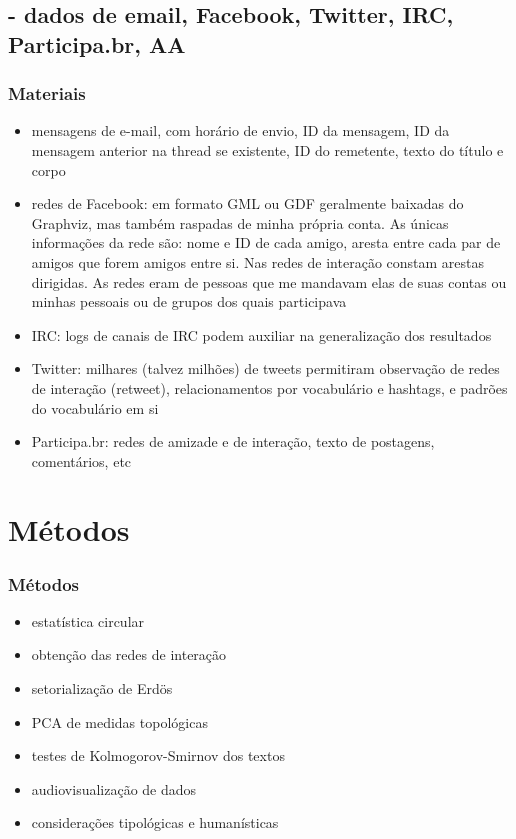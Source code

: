\documentclass[10pt]{beamer}
\begin{document}
\subsection{- dados de email, Facebook, Twitter, IRC, Participa.br, AA}
\begin{frame}
\frametitle{Materiais}
\begin{itemize}
	\item mensagens de e-mail, com horário de envio, ID da mensagem, ID da mensagem anterior na thread se existente, ID do remetente, texto do título e corpo
	\item redes de Facebook: em formato GML ou GDF geralmente baixadas do Graphviz, mas também raspadas de minha própria conta. As únicas informações da rede são: nome e ID de cada amigo, aresta entre cada par de amigos que forem amigos entre si. Nas redes de interação constam arestas dirigidas. As redes eram de pessoas que me mandavam elas de suas contas ou minhas pessoais ou de grupos dos quais participava
	\item IRC: logs de canais de IRC podem auxiliar na generalização dos resultados
	\item Twitter: milhares (talvez milhões) de tweets permitiram observação de redes de interação (retweet), relacionamentos por vocabulário e hashtags, e padrões do vocabulário em si
	\item Participa.br: redes de amizade e de interação, texto de postagens, comentários, etc
\end{itemize}
\end{frame}


\section{Métodos}
\begin{frame}
\frametitle{Métodos}
\begin{itemize}
	\item estatística circular
	\item obtenção das redes de interação
	\item setorialização de Erdös
	\item PCA de medidas topológicas
	\item testes de Kolmogorov-Smirnov dos textos
	\item audiovisualização de dados
	\item considerações tipológicas e humanísticas
\end{itemize}
\end{frame}
\end{document}
